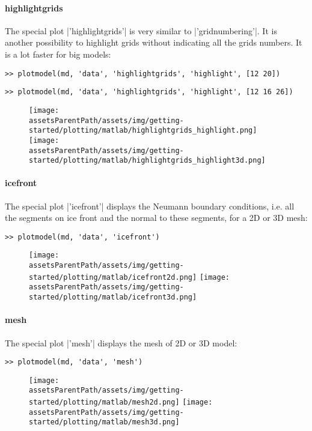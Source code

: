 \paragraph{highlightgrids}%
The special plot \lstinlinebg|'highlightgrids'| is very similar to \lstinlinebg|'gridnumbering'|. It is another possibility to highlight grids without indicating all the grids numbers. It is a lot faster for big models:
\begin{lstlisting}
>> plotmodel(md, 'data', 'highlightgrids', 'highlight', [12 20])
\end{lstlisting}
\begin{lstlisting}
>> plotmodel(md, 'data', 'highlightgrids', 'highlight', [12 16 26])
\end{lstlisting}
\begin{figure}[H]
	\begin{center}
		\texttt{[image: \\assetsParentPath/assets/img/getting-started/plotting/matlab/highlightgrids\_highlight.png]}
		\texttt{[image: \\assetsParentPath/assets/img/getting-started/plotting/matlab/highlightgrids\_highlight3d.png]}
	\end{center}
\end{figure}
\paragraph{icefront}%
The special plot \lstinlinebg|'icefront'| displays the Neumann boundary conditions, i.e. all the segments on ice front and the normal to these segments, for a 2D or 3D mesh:
\begin{lstlisting}
>> plotmodel(md, 'data', 'icefront')
\end{lstlisting}
\begin{figure}[H]
	\begin{center}
		\texttt{[image: \\assetsParentPath/assets/img/getting-started/plotting/matlab/icefront2d.png]}
		\texttt{[image: \\assetsParentPath/assets/img/getting-started/plotting/matlab/icefront3d.png]}
	\end{center}
\end{figure}
\paragraph{mesh}%
The special plot \lstinlinebg|'mesh'| displays the mesh of 2D or 3D model:
\begin{lstlisting}
>> plotmodel(md, 'data', 'mesh')
\end{lstlisting}
\begin{figure}[H]
	\begin{center}
		\texttt{[image: \\assetsParentPath/assets/img/getting-started/plotting/matlab/mesh2d.png]}
		\texttt{[image: \\assetsParentPath/assets/img/getting-started/plotting/matlab/mesh3d.png]}
	\end{center}
\end{figure}
